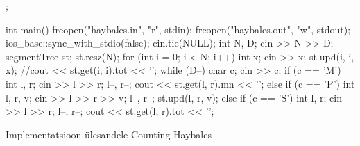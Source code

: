 \documentclass{trkut}
\begin{document}
\begin{cclol}
{};

int main() {
  freopen("haybales.in", "r", stdin);
  freopen("haybales.out", "w", stdout);
  ios_base::sync_with_stdio(false);
  cin.tie(NULL);
  int N, D;
  cin >> N >> D;
  segmentTree st;
  st.resz(N);
  for (int i = 0; i < N; i++) {
    int x;
    cin >> x;
    st.upd(i, i, x);
    //cout << st.get(i, i).tot << '\n';
  }
  while (D--) {
    char c;
    cin >> c;
    if (c == 'M') {
      int l, r;
      cin >> l >> r;
      l--, r--;
      cout << st.get(l, r).mn << '\n';
    } else if (c == 'P') {
      int l, r, v;
      cin >> l >> r >> v;
      l--, r--;
      st.upd(l, r, v);
    } else if (c == 'S') {
      int l, r;
      cin >> l >> r;
      l--, r--;
      cout << st.get(l, r).tot << '\n';
    }
  }
}
\end{cclol}
 \begin{kk}[H]%
    \caption{Implementatsioon ülesandele Counting Haybales}%
    \label{EMaxx}%
    \end{kk}
\end{document}
